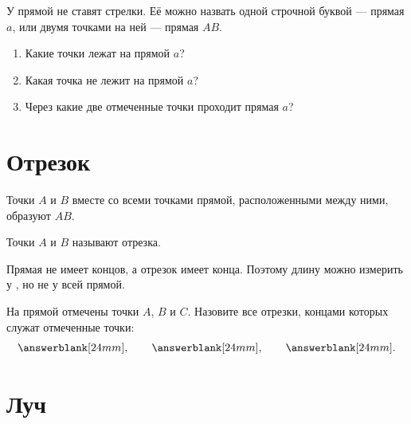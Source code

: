 \begin{notebox}
  У прямой не ставят стрелки. Её можно назвать одной строчной буквой —
  прямая \(a\), или двумя точками на ней — прямая \(AB\).
\end{notebox}

\incidenceexamplefigure

\begin{practicebox}
  \begin{enumerate}[label=\alph*),itemsep=0.35em]
    \item Какие точки лежат на прямой \(a\)? \answerblank[45mm]
    \item Какая точка не лежит на прямой \(a\)? \answerblank[25mm]
    \item Через какие две отмеченные точки проходит прямая \(a\)?
      \answerblank[35mm]
  \end{enumerate}
\end{practicebox}

\section{Отрезок}

\segmentexamplefigure

\begin{fillbox}
  Точки \(A\) и \(B\) вместе со всеми точками прямой, расположенными между
  ними, образуют \answerblank[30mm] \(AB\).

  Точки \(A\) и \(B\) называют \answerblank[34mm] отрезка.
\end{fillbox}

\begin{checkpointbox}
  Прямая не имеет концов, а отрезок имеет \answerblank[18mm] конца.
  Поэтому длину можно измерить у \answerblank[34mm], но не у всей прямой.
\end{checkpointbox}

\threelinepointsfigure

\begin{practicebox}
  На прямой отмечены точки \(A\), \(B\) и \(C\). Назовите все отрезки,
  концами которых служат отмеченные точки:
  \[
    \answerblank[24mm],\qquad
    \answerblank[24mm],\qquad
    \answerblank[24mm].
  \]
\end{practicebox}

\section{Луч}

